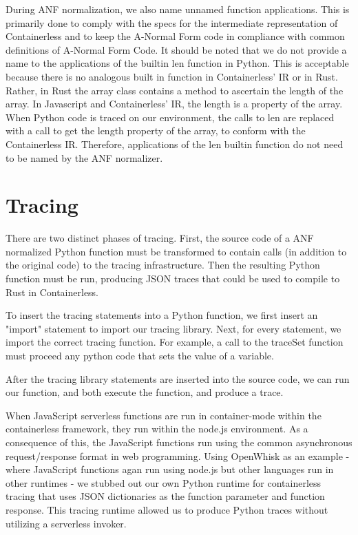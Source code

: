 \documentclass[acmsmall,review,authorversion]{acmart}
\begin{document}
\par 
During ANF normalization, we also name unnamed function applications.  This is primarily done to comply with the specs for the intermediate representation of Containerless and to keep the A-Normal Form code in compliance with common definitions of A-Normal Form Code. It should be noted that we do not provide a name to the applications of the builtin len function in Python. This is acceptable because there is no analogous built in function in Containerless' IR or in Rust. Rather, in Rust the array class contains a method to ascertain the length of the array. In Javascript and Containerless' IR, the length is a property of the array. When Python code is traced on our environment, the calls to len are replaced with a call to get the length property of the array, to conform with the Containerless IR. Therefore, applications of the len builtin function do not need to be named by the ANF normalizer. 

\section{Tracing}
\label{section:tracing}

There are two distinct phases of tracing. First, the source code of a ANF normalized Python function must be transformed to contain calls (in addition to the original code) to the tracing infrastructure. 
Then the resulting Python function must be run, producing JSON traces that could be used to compile to Rust in Containerless. 

To insert the tracing statements into a Python function, we first insert an "import" statement to import our tracing library.
Next, for every statement, we import the correct tracing function. For example, a call to the traceSet function must proceed any python code that sets the value of a variable.

After the tracing library statements are inserted into the source code, we can run our function, and both execute the function, and produce a trace. 

When JavaScript serverless functions are run in container-mode within the containerless framework, they run within the node.js environment. As a consequence of this, the JavaScript functions run using the common asynchronous request/response format in web programming. Using OpenWhisk as an example - where JavaScript functions agan run using node.js but other languages run in other runtimes - we stubbed out our own Python runtime for containerless tracing that uses JSON dictionaries as the function parameter and function response. This tracing runtime allowed us to produce Python traces without utilizing a serverless invoker. 
\end{document}
